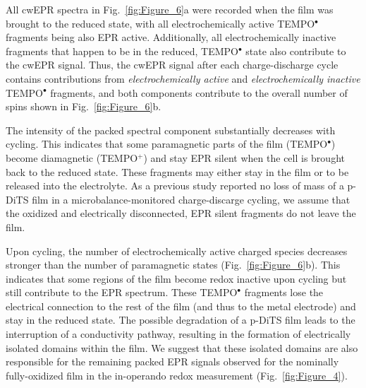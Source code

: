 \par
All cwEPR spectra in Fig.~\ref{fig:Figure_6}a were recorded when the film was brought to the reduced state, with all electrochemically active TEMPO$^\bullet$ fragments being also EPR active. Additionally, all electrochemically inactive fragments that happen to be in the reduced, TEMPO$^\bullet$ state also contribute to the cwEPR signal. Thus, the cwEPR signal after each charge-discharge cycle contains contributions from \emph{electrochemically active} and \emph{electrochemically inactive} TEMPO$^\bullet$ fragments, and both components contribute to the overall number of spins shown in Fig.~\ref{fig:Figure_6}b.

\par
The intensity of the packed spectral component substantially decreases with cycling. This indicates that some paramagnetic parts of the film (TEMPO$^{\bullet}$) become diamagnetic (TEMPO$^{+}$) and stay EPR silent when the cell is brought back to the reduced state. These fragments may either stay in the film or to be released into the electrolyte. 
As a previous study reported no loss of mass of a p-DiTS film in a microbalance-monitored charge-discarge cycling, \cite{vereshchagin2020} we assume that the oxidized and electrically disconnected, EPR silent fragments do not leave the film.



\par
Upon cycling, the number of electrochemically active charged species decreases stronger than the number of paramagnetic states (Fig.~\ref{fig:Figure_6}b). This  indicates that some regions of the film become redox inactive upon cycling but still contribute to the EPR spectrum. These TEMPO$^{\bullet}$ fragments lose the electrical connection to the rest of the film (and thus to the metal electrode) and stay in the reduced state. The possible degradation of a p-DiTS film leads to the interruption of a conductivity pathway, resulting in the formation of electrically isolated domains within the film. We suggest that these isolated domains are also responsible for the remaining packed EPR signals observed for the nominally fully-oxidized film in the in-operando redox measurement (Fig.~\ref{fig:Figure_4}).


